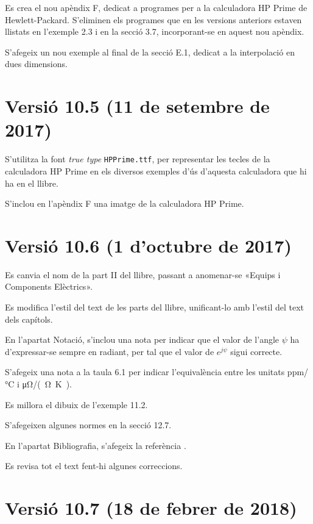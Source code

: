 Es crea el nou apèndix F, dedicat a programes per a la calculadora \textsf{HP Prime} de Hewlett-Packard. S'eliminen els programes que en les versions anteriors estaven llistats en l'exemple 2.3 i en la secció 3.7, incorporant-se en aquest nou apèndix.

S'afegeix un nou exemple al final de la secció E.1, dedicat  a la interpolació en dues dimensions.

\section*{Versió 10.5 (11 de setembre de 2017)}

S'utilitza la font \textit{true type} \texttt{HPPrime.ttf}, per representar les tecles de la calculadora \textsf{HP Prime} en els diversos exemples d'ús d'aquesta calculadora que hi ha en el llibre.

S'inclou en l'apèndix F una imatge de la calculadora \textsf{HP Prime}.


\section*{Versió 10.6 (1 d'octubre de 2017)}

Es canvia el nom de la part II del llibre, passant a anomenar-se «Equips i Components Elèctrics».

Es modifica l'estil del text de les parts del llibre, unificant-lo amb l'estil del text dels capítols.

En l'apartat Notació, s'inclou una nota per indicar  que el valor de l'angle $\psi$ ha d'expressar-se sempre en radiant, per tal que el valor de $e^{j\psi}$ sigui correcte.

S'afegeix una nota a la taula 6.1 per indicar l'equivalència entre les unitats \unit{ppm/\degreeCelsius}  i \unit{\micro\ohm/(\ohm.\kelvin)}.

Es millora el dibuix de l'exemple 11.2.

S’afegeixen algunes normes en la secció 12.7.

En l'apartat Bibliografia, s'afegeix la referència \cite{BUR}.

Es revisa tot el text fent-hi algunes correccions.


\section*{Versió 10.7 (18 de febrer de 2018)}

